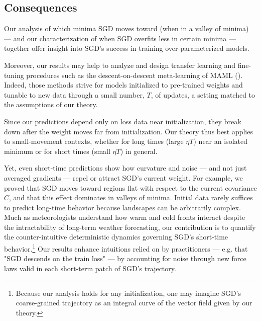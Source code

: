 \documentclass{article}
\theoremstyle{plain}
\theoremstyle{definition}
\begin{document}
    \subsection{Consequences}

        Our analysis of which minima SGD moves toward (when in a valley of
        minima) --- and our characterization of when SGD overfits less in
        certain minima --- together offer insight into SGD's success in
        training over-parameterized models. 

        Moreover, our results may help to analyze and design transfer learning
        and fine-tuning procedures such as the descent-on-descent meta-learning of
        MAML (\cite{fi17}).  Indeed, those methods strive for models
        initialized to pre-trained weights and tunable to new data through a
        small number, $T$, of updates, a setting matched to the assumptions of
        our theory.

        Since our predictions depend only on loss data near initialization,
        they break down after the weight moves far from initialization.  Our
        theory thus best applies to small-movement contexts, whether for long
        times (large $\eta T$) near an isolated minimum or for short times
        (small $\eta T$) in general.
        
        Yet, even short-time predictions show how curvature and noise ---
        and not just averaged gradients --- repel or attract SGD's current
        weight.  For example, we proved that SGD moves toward regions flat with
        respect to the current covariance $C$, and that this effect dominates
        in valleys of minima. Initial data rarely suffices to
        predict long-time behavior because landscapes can be arbitrarily
        complex.  Much as meteorologists understand how warm and cold fronts
        interact despite the intractability of long-term weather forecasting,
        our contribution is to quantify the counter-intuitive deterministic
        dynamics governing SGD's short-time behavior.\footnote{
            Because our analysis holds for any initialization, one may imagine
            SGD's coarse-grained trajectory as an integral curve of the vector
            field given by our theory.
        }
        Our results enhance intuitions relied on by practitioners --- e.g. that
        "SGD descends on the train loss" --- by accounting for noise through
        new force laws valid in each short-term patch of SGD's trajectory. 

\end{document}
